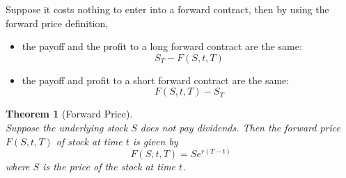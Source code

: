 \documentclass[12pt]{article}
\newtheorem{theorem}{Theorem}[section]
\theoremstyle{definition}
\begin{document}
Suppose it costs nothing to enter into a forward contract, then by using the forward price definition, 
\begin{itemize}
  \item the payoff and the profit to a long forward contract are the same:
  \[
S_T-F(S, t, T)
  \]
  \item the payoff and profit to a short forward contract are the same:
  \[
F(S,t,T) - S_T
  \]
\end{itemize}
\begin{theorem}[Forward Price]
\hfill\\\normalfont Suppose the underlying stock $S$ does not pay dividends. Then the forward price $F(S,t, T)$ of stock at time $t$ is given by
\[
F(S,t,T) = Se^{r(T-t)}
\]
where $S$ is the price of the stock at time $t$.
\end{theorem}
\end{document}
